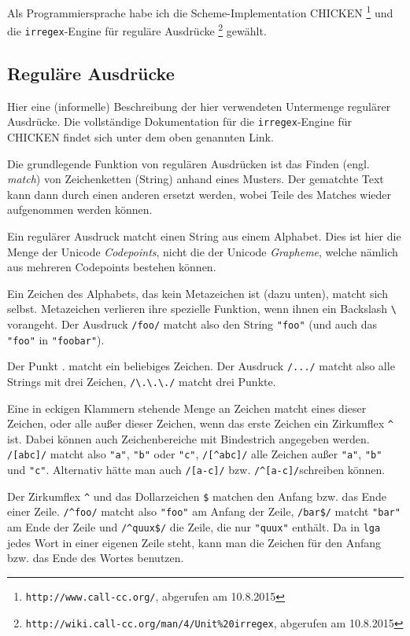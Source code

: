 \documentclass[12pt,a4paper,normalheadings,bibliography=totoc]{scrartcl}
\def\bel#1{\mbox{\textit{#1}}}
\def\tt#1{\texttt{#1}}
\def\rx#1{\texttt{/#1/}}
\def\str#1{\texttt{"#1"}}
\begin{document}
Als Programmiersprache habe ich die Scheme-Implementation CHICKEN
\footnote{\tt{http://www.call-cc.org/}, abgerufen am 10.8.2015}
und die \tt{irregex}-Engine für reguläre Ausdrücke
\footnote{\tt{http://wiki.call-cc.org/man/4/Unit\%20irregex}, abgerufen am 10.8.2015}
gewählt.

\subsection{Reguläre Ausdrücke}

Hier eine (informelle)
Beschreibung der hier verwendeten Untermenge regulärer Ausdrücke.
Die vollständige Dokumentation für die \tt{irregex}-Engine für
CHICKEN findet sich unter dem oben genannten Link.

Die grundlegende Funktion von regulären Ausdrücken ist das
Finden (engl. \bel{match}) von Zeichenketten (String) anhand eines Musters.
Der gematchte Text kann dann durch einen anderen ersetzt werden,
wobei Teile des Matches wieder aufgenommen werden können.

Ein regulärer Ausdruck matcht einen String aus einem Alphabet.
Dies ist hier die Menge der Unicode \emph{Codepoints}, nicht die
der Unicode \emph{Grapheme},
welche nämlich aus mehreren Codepoints bestehen können.

Ein Zeichen des Alphabets, das kein Metazeichen ist (dazu unten),
matcht sich selbst.
Metazeichen verlieren ihre spezielle Funktion,
wenn ihnen ein Backslash \tt{\textbackslash} vorangeht.
Der Ausdruck \rx{foo} matcht also den String \str{foo}
(und auch das \str{foo} in \str{foobar}).

Der Punkt . matcht ein beliebiges Zeichen.
Der Ausdruck \rx{...} matcht also alle Strings mit drei Zeichen,
\rx{\textbackslash.\textbackslash.\textbackslash.} matcht drei Punkte.

Eine in eckigen Klammern stehende Menge an Zeichen matcht eines dieser Zeichen,
oder alle außer dieser Zeichen,
wenn das erste Zeichen ein Zirkumflex \tt{\textasciicircum} ist.
Dabei können auch Zeichenbereiche mit Bindestrich angegeben werden.
\rx{[abc]} matcht also \str{a}, \str{b} oder \str{c},
\rx{[\textasciicircum{}abc]} alle Zeichen außer \str{a}, \str{b} und \str{c}.
Alternativ hätte man auch \rx{[a-c]} bzw. \rx{\textasciicircum[a-c]}schreiben können.

Der Zirkumflex \tt{\textasciicircum} und das Dollarzeichen \tt{\$}
matchen den Anfang bzw. das Ende einer Zeile.
\rx{\textasciicircum{}foo} matcht also \str{foo} am Anfang der Zeile,
\rx{bar\$} matcht \str{bar} am Ende der Zeile
und \rx{\textasciicircum{}quux\$} die Zeile, die nur \str{quux} enthält.
Da in \tt{lga} jedes Wort in einer eigenen Zeile steht,
kann man die Zeichen für den Anfang bzw. das Ende des Wortes benutzen.
\end{document}
